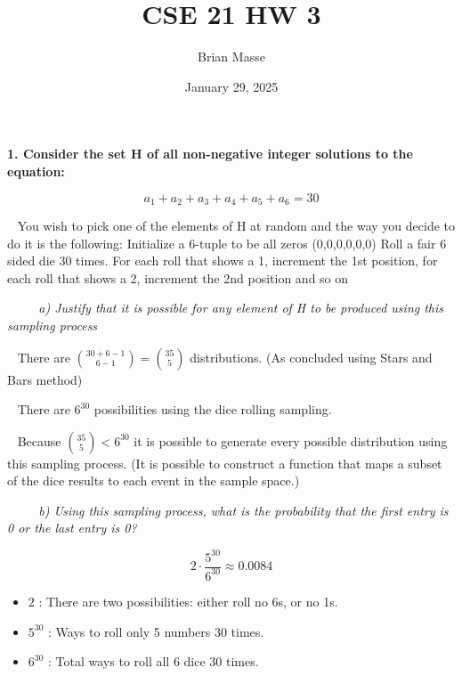 \documentclass[12pt, letterpaper]{article}
\title{CSE 21 HW 3}
\author{Brian Masse}
\date{January 29, 2025}
\begin{document}
\maketitle
\newpage

\bf{ 1. Consider the set H of all non-negative integer solutions to the equation: }

\[ a_{1} + a_{2} + a_{3} + a_{4} + a_{5} + a_{6} = 30  \]

\-\ \newline
\textnormal{You wish to pick one of the elements of H at random and the way you decide to do it is the following:
Initialize a 6-tuple to be all zeros (0,0,0,0,0,0) Roll a fair 6 sided die 30 times. For each roll that shows a 1, increment the 1st position, for each roll
that shows a 2, increment the 2nd position and so on}

\-\ \newline
\-\ \newline
\-\ \it{ a) Justify that it is possible for any element of H to be produced using this sampling process }

\-\ \newline
\textnormal{There are \( {30 + 6 - 1 \choose 6 - 1} = {35 \choose 5} \) distributions. (As concluded using Stars and Bars method)}

\-\ \newline
\textnormal{ There are \(6^{30}\) possibilities using the dice rolling sampling. }

\-\ \newline
\textnormal{ Because \({35 \choose 5} < 6^{30}\) it is possible to generate every possible distribution using this sampling process. (It is possible to construct a function that maps a subset of the dice results to each event in the sample space.)}

\-\ \newline
\-\ \newline
\-\ \it{ b) Using this sampling process, what is the probability that the first entry is 0 or the last entry is 0? }

\[ 2 \cdot \frac{5^{30}}{6^{30}} \approx 0.0084\]

\begin{itemize}
    \item \(2\) : There are two possibilities: either roll no 6s, or no 1s.
    \item \({5^{30}}\) : Ways to roll only 5 numbers 30 times.
    \item \(6^{30}\) : Total ways to roll all 6 dice 30 times.
\end{itemize} 
\end{document}
